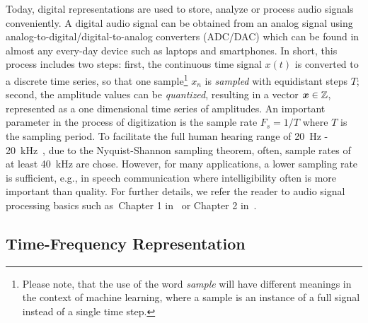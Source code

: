 Today, digital representations are used to store, analyze or process audio signals conveniently.
A digital audio signal can be obtained from an analog signal using analog-to-digital/digital-to-analog converters (ADC/DAC) which can be found in almost any every-day device such as laptops and smartphones.
In short, this process includes two steps: first, the continuous time signal \(x(t)\) is converted to a discrete time series, so that one sample\footnote{Please note, that the use of the word \emph{sample} will have different meanings in the context of machine learning, where a sample is an instance of a full signal instead of a single time step.} \(x_n\) is \emph{sampled} with equidistant steps \(T\); second, the amplitude values can be \emph{quantized}, resulting in a vector \({\bm{x}} \in {\mathbb{Z}}\), represented as a one dimensional time series of amplitudes.
An important parameter in the process of digitization is the sample rate \(F_s = 1/T\) where \(T\) is the sampling period.
To facilitate the full human hearing range of 20~\si{\hertz} - 20~\si{\kilo\hertz}~\cite{fastl90, moore89}, due to the Nyquist-Shannon sampling theorem, often, sample rates of at least 40~\si{\kilo\hertz} are chose.
However, for many applications, a lower sampling rate is sufficient, e.g., in speech communication where intelligibility often is more important than quality.
For further details, we refer the reader to audio signal processing basics such as~Chapter 1 in~\cite{proakis96} or Chapter 2 in~\cite{Mueller15}.

\hypertarget{time-frequency-representation}{%
\subsection{Time-Frequency Representation}\label{sub:time-frequency-representation}}

